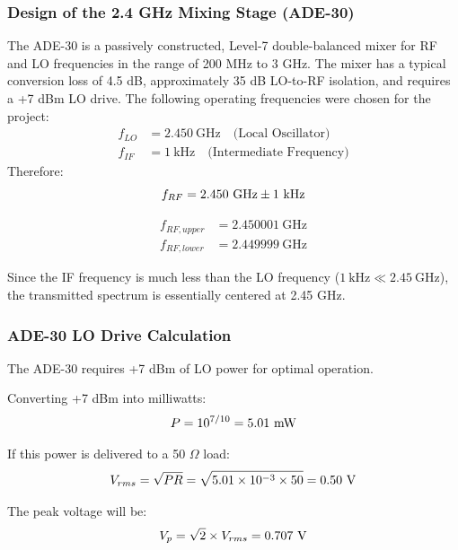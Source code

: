 \documentclass[12pt,a4paper]{report}
\begin{document}
	\subsubsection{Design of the 2.4 GHz Mixing Stage (ADE-30)}
	The ADE-30 is a passively constructed, Level-7 double-balanced mixer for RF and LO frequencies in the range of 200 MHz to 3 GHz. The mixer has a typical conversion loss of 4.5 dB, approximately 35 dB LO-to-RF isolation, and requires a +7 dBm LO drive. The following operating frequencies were chosen for the project:
	\begin{align*}
		f_{LO} &= 2.450\ \text{GHz} \quad \text{(Local Oscillator)} \\
		f_{IF} &= 1\ \text{kHz} \quad \text{(Intermediate Frequency)}
	\end{align*}
	Therefore:
	\begingroup
	\setlength{\mathindent}{0pt}
	\begin{equation*}
		\hfill
		f_{RF} = 2.450\ \text{GHz} \pm 1\ \text{kHz}
		\hfill
	\end{equation*}
	\endgroup
	
	\begin{align*}
		f_{RF,upper} &= 2.450001\ \text{GHz} \\
		f_{RF,lower} &= 2.449999\ \text{GHz}
	\end{align*}
	
	Since the IF frequency is much less than the LO frequency ($1\ \text{kHz} \ll 2.45\ \text{GHz}$), the transmitted spectrum is essentially centered at 2.45 GHz.
	
	\subsubsection{ADE-30 LO Drive Calculation}
	
	The ADE-30 requires +7 dBm of LO power for optimal operation.
	
	Converting +7 dBm into milliwatts:
	\begingroup
	\setlength{\mathindent}{0pt}
	\begin{equation*}
		\hfill
		P = 10^{7/10} = 5.01\ \text{mW}
		\hfill
	\end{equation*}
	\endgroup
	
	If this power is delivered to a 50 $\Omega$ load:
	\begingroup
	\setlength{\mathindent}{0pt}
	\begin{equation*}
		\hfill
		V_{rms} = \sqrt{PR} = \sqrt{5.01 \times 10^{-3} \times 50} = 0.50\ \text{V}
		\hfill
	\end{equation*}
	\endgroup
	
	The peak voltage will be:
	\begingroup
	\setlength{\mathindent}{0pt}
	\begin{equation*}
		\hfill
		V_p = \sqrt{2} \times V_{rms} = 0.707\ \text{V}
		\hfill
	\end{equation*}
	\endgroup
	
\end{document}
